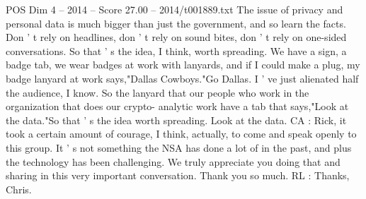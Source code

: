 \begin{textsample}{POS Dim 4 – 2014 – Score 27.00 – 2014/t001889.txt}
The issue of privacy and personal data is much bigger than just the government, and so learn the facts.
Don ' t rely on headlines, don ' t rely on sound bites, don ' t rely on one-sided conversations.
So that ' s the idea, I think, worth spreading.
We have a sign, a badge tab, we wear badges at work with lanyards, and if I could make a plug, my badge lanyard at work says,"Dallas Cowboys."Go Dallas.
I ' ve just alienated half the audience, I know.
So the lanyard that our people who work in the organization that does our crypto- analytic work have a tab that says,"Look at the data."So that ' s the idea worth spreading.
Look at the data.
CA : Rick, it took a certain amount of courage, I think, actually, to come and speak openly to this group.
It ' s not something the NSA has done a lot of in the past, and plus the technology has been challenging.
We truly appreciate you doing that and sharing in this very important conversation.
Thank you so much.
RL : Thanks, Chris.

\end{textsample}
